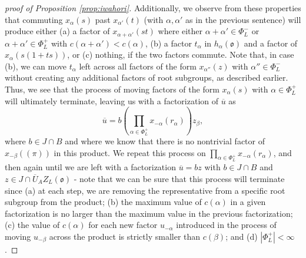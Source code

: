 \documentclass[11pt,letterpaper]{article}
\newcommand{\goth}{\mathfrak}
\theoremstyle{remark}
\numberwithin{equation}{section}
\begin{document}
\begin{proof}[proof of Proposition \ref{prop:iwahori}]
Additionally, we observe from these properties that commuting $x_{\alpha}(s)$ past $x_{\alpha'}(t)$ (with $\alpha,\alpha'$ as in the previous sentence) will produce either (a) a factor of $x_{\alpha+\alpha'}(st)$ where either $\alpha+\alpha' \in \Phi_L^-$ or $\alpha+\alpha' \in \Phi_L^+$ with $c(\alpha+\alpha')< c(\alpha)$, (b) a factor $t_{\alpha}$ in $h_{\alpha}(\goth{o})$ and a factor of $x_{\alpha}(s(1+ts))$, or (c) nothing, if the two factors commute. Note that, in case (b), we can move $t_{\alpha}$ left across all factors of the form $x_{\alpha''}(z)$ with $\alpha'' \in \Phi_L^-$ without creating any additional factors of root subgroups, as described earlier. Thus, we see that the process of moving factors of the form $x_{\alpha}(s)$ with $\alpha \in \Phi_L^+$ will ultimately terminate, leaving us with a factorization of $\overline{u}$ as $$\overline{u} = b \left(\prod_{\alpha \in \Phi_L^+} x_{-\alpha}(r_{\alpha})\right) z_{\beta},$$ where $b \in J \cap B$ and where we know that there is no nontrivial factor of $x_{-\beta}((\pi))$ in this product. We repeat this process on $\prod_{\alpha \in \Phi_L^+} x_{-\alpha}(r_{\alpha})$, and then again until we are left with a factorization $\overline{u} = bz$ with $b \in J \cap B$ and $z \in J \cap \overline{U}_AZ_L(\goth{o})$ - note that we can be sure that this process will terminate since (a) at each step, we are removing the representative from a specific root subgroup from the product; (b) the maximum value of $c(\alpha)$ in a given factorization is no larger than the maximum value in the previous factorization; (c) the value of $c(\alpha)$ for each new factor $u_{-\alpha}$ introduced in the process of moving $u_{-\beta}$ across the product is strictly smaller than $c(\beta)$; and (d) $|\Phi_L^+|< \infty$.



\end{proof}
\end{document}
